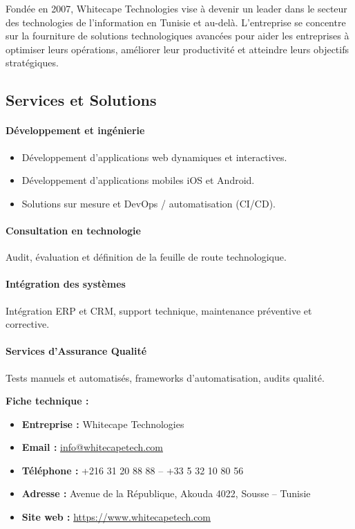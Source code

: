Fondée en 2007, Whitecape Technologies vise à devenir un leader dans le secteur
des technologies de l'information en Tunisie et au-delà. L'entreprise se concentre
sur la fourniture de solutions technologiques avancées pour aider les entreprises à
optimiser leurs opérations, améliorer leur productivité et atteindre leurs objectifs
stratégiques.

\subsection{Services et Solutions}

\paragraph{Développement et ingénierie}
\begin{itemize}
  \item Développement d'applications web dynamiques et interactives.
  \item Développement d'applications mobiles iOS et Android.
  \item Solutions sur mesure et DevOps / automatisation (\ac{CI}/\ac{CD}).
\end{itemize}

\paragraph{Consultation en technologie}
Audit, évaluation et définition de la feuille de route technologique.

\paragraph{Intégration des systèmes}
Intégration ERP et CRM, support technique, maintenance préventive et corrective.

\paragraph{Services d'Assurance Qualité}
Tests manuels et automatisés, frameworks d'automatisation, audits qualité.

\medskip
\noindent\textbf{Fiche technique :}
\begin{itemize}
  \item \textbf{Entreprise :} Whitecape Technologies
  \item \textbf{Email :} \href{mailto:info@whitecapetech.com}{info@whitecapetech.com}
  \item \textbf{Téléphone :} +216 31 20 88 88 – +33 5 32 10 80 56
  \item \textbf{Adresse :} Avenue de la République, Akouda 4022, Sousse – Tunisie
  \item \textbf{Site web :} \url{https://www.whitecapetech.com}
\end{itemize}


